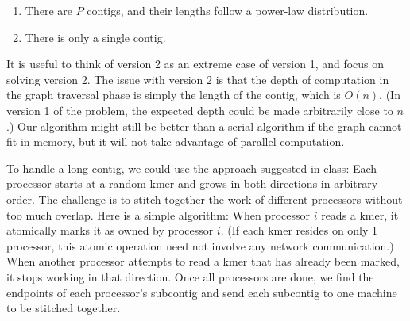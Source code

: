 \documentclass{article}
\begin{document}
\begin{enumerate}
  \item There are $P$ contigs, and their lengths follow a power-law distribution.
  \item There is only a single contig.
\end{enumerate}

It is useful to think of version 2 as an extreme case of version 1, and focus on solving version 2.  The issue with version 2 is that the depth of computation in the graph traversal phase is simply the length of the contig, which is $O(n)$.  (In version 1 of the problem, the expected depth could be made arbitrarily close to $n$.)  Our algorithm might still be better than a serial algorithm if the graph cannot fit in memory, but it will not take advantage of parallel computation.

To handle a long contig, we could use the approach suggested in class: Each processor starts at a random kmer and grows in both directions in arbitrary order.  The challenge is to stitch together the work of different processors without too much overlap.  Here is a simple algorithm: When processor $i$ reads a kmer, it atomically marks it as owned by processor $i$.  (If each kmer resides on only 1 processor, this atomic operation need not involve any network communication.)  When another processor attempts to read a kmer that has already been marked, it stops working in that direction.  Once all processors are done, we find the endpoints of each processor's subcontig and send each subcontig to one machine to be stitched together.



\end{document}
